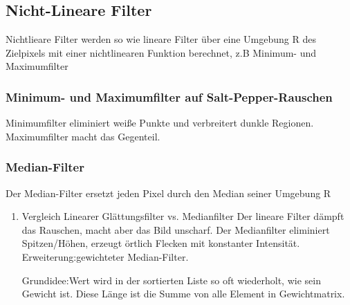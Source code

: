 \documentclass[11pt]{article}
\begin{document}
\subsection{Nicht-Lineare Filter}
\label{sec:org071d02f}
Nichtlieare Filter werden so wie lineare Filter über eine Umgebung R des Zielpixels mit einer nichtlinearen Funktion berechnet, z.B Minimum- und Maximumfilter
\subsubsection{Minimum- und Maximumfilter auf Salt-Pepper-Rauschen}
\label{sec:org29dbad5}
Minimumfilter eliminiert weiße Punkte und verbreitert dunkle Regionen.
Maximumfilter macht das Gegenteil.
\subsubsection{Median-Filter}
\label{sec:org9b741a7}
Der Median-Filter ersetzt jeden Pixel durch den Median seiner Umgebung R
\begin{enumerate}
\item Vergleich Linearer Glättungsfilter vs. Medianfilter
\label{sec:orgb05d554}
Der lineare Filter dämpft das Rauschen, macht aber das Bild unscharf. Der Medianfilter eliminiert Spitzen/Höhen, erzeugt örtlich Flecken mit konstanter Intensität. Erweiterung:gewichteter Median-Filter.

Grundidee:Wert wird in der sortierten Liste so oft wiederholt, wie sein Gewicht ist. Diese Länge ist die Summe von alle Element in Gewichtmatrix.
\end{enumerate}
\end{document}
